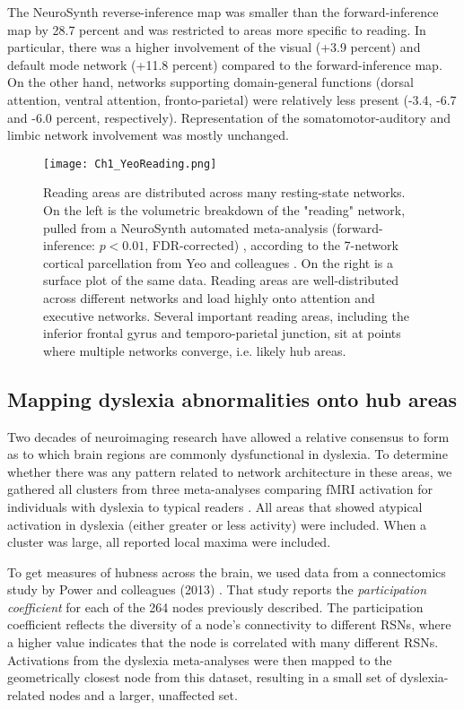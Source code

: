 The NeuroSynth reverse-inference map was smaller than the forward-inference map by 28.7 percent and was restricted to areas more specific to reading. In particular, there was a higher involvement of the visual (+3.9 percent) and default mode network (+11.8 percent) compared to the forward-inference map. On the other hand, networks supporting domain-general functions (dorsal attention, ventral attention, fronto-parietal) were relatively less present (-3.4, -6.7 and -6.0 percent, respectively). Representation of the somatomotor-auditory and limbic network involvement was mostly unchanged.

\begin{figure}
\centering
\texttt{[image: Ch1\_YeoReading.png]}
    \caption[Reading areas are distributed across many resting-state networks.]{Reading areas are distributed across many resting-state networks. On the left is the volumetric breakdown of the "reading" network, pulled from a NeuroSynth automated meta-analysis (forward-inference: $p < 0.01$, FDR-corrected) \cite{Yarkoni2011}, according to the 7-network cortical parcellation from Yeo and colleagues \cite{Yeo2011}. On the right is a surface plot of the same data. Reading areas are well-distributed across different networks and load highly onto attention and executive networks. Several important reading areas, including the inferior frontal gyrus and temporo-parietal junction, sit at points where multiple networks converge, i.e. likely hub areas.}
    \label{fig:texlogo}
\end{figure}



\subsection{Mapping dyslexia abnormalities onto hub areas}
Two decades of neuroimaging research have allowed a relative consensus to form as to which brain regions are commonly dysfunctional in dyslexia. To determine whether there was any pattern related to network architecture in these areas, we gathered all clusters from three meta-analyses comparing fMRI activation for individuals with dyslexia to typical readers \cite{Maisog2008, Richlan2009, Paulesu2014}. All areas that showed atypical activation in dyslexia (either greater or less activity) were included. When a cluster was large, all reported local maxima were included. 

To get measures of hubness across the brain, we used data from a connectomics study by Power and colleagues (2013) \cite{Power2013}. That study reports the \textit{participation coefficient} for each of the 264 nodes previously described. The participation coefficient reflects the diversity of a node's connectivity to different RSNs, where a higher value indicates that the node is correlated with many different RSNs. Activations from the dyslexia meta-analyses were then mapped to the geometrically closest node from this dataset, resulting in a small set of dyslexia-related nodes and a larger, unaffected set.

